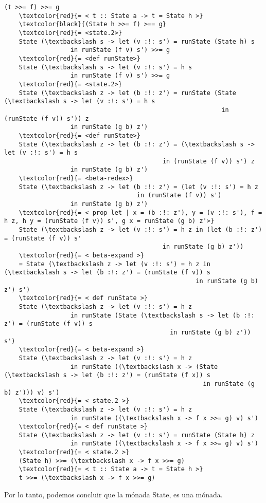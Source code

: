 \documentclass[11pt]{article}
\begin{document}
\begin{Verbatim}[commandchars=\\\{\}] 
    (t >>= f) >>= g
    \textcolor{red}{= < t :: State a -> t = State h >}
    \textcolor{black}{(State h >>= f) >== g}
    \textcolor{red}{= <state.2>}
    State (\textbackslash s -> let (v :!: s') = runState (State h) s
                  in runState (f v) s') >>= g
    \textcolor{red}{= <def runState>}
    State (\textbackslash s -> let (v :!: s') = h s 
                  in runState (f v) s') >>= g
    \textcolor{red}{= <state.2>}
    State (\textbackslash z -> let (b :!: z') = runState (State (\textbackslash s -> let (v :!: s') = h s
                                                           in (runState (f v)) s')) z
                  in runState (g b) z')
    \textcolor{red}{= <def runState>}
    State (\textbackslash z -> let (b :!: z') = (\textbackslash s -> let (v :!: s') = h s 
                                           in (runState (f v)) s') z
                  in runState (g b) z')
    \textcolor{red}{= <beta-redex>}
    State (\textbackslash z -> let (b :!: z') = (let (v :!: s') = h z 
                                    in (runState (f v)) s')
                  in runState (g b) z')
    \textcolor{red}{= < prop let | x = (b :!: z'), y = (v :!: s'), f = h z, h y = (runState (f v)) s', g x = runState (g b) z'>}
    State (\textbackslash z -> let (v :!: s') = h z in (let (b :!: z') = (runState (f v)) s' 
                                           in runState (g b) z'))
    \textcolor{red}{= < beta-expand >}
    = State (\textbackslash z -> let (v :!: s') = h z in (\textbackslash s -> let (b :!: z') = (runState (f v)) s
                                                    in runState (g b) z') s')
    \textcolor{red}{= < def runState >}
    State (\textbackslash z -> let (v :!: s') = h z 
                  in runState (State (\textbackslash s -> let (b :!: z') = (runState (f v)) s
                                             in runState (g b) z')) s')
    \textcolor{red}{= < beta-expand >}
    State (\textbackslash z -> let (v :!: s') = h z 
                  in runState ((\textbackslash x -> (State (\textbackslash s -> let (b :!: z') = (runState (f x)) s
                                                      in runState (g b) z'))) v) s')
    \textcolor{red}{= < state.2 >}
    State (\textbackslash z -> let (v :!: s') = h z 
                  in runState ((\textbackslash x -> f x >>= g) v) s')
    \textcolor{red}{= < def runState >}
    State (\textbackslash z -> let (v :!: s') = runState (State h) z 
                  in runState ((\textbackslash x -> f x >>= g) v) s')
    \textcolor{red}{= < state.2 >}
    (State h) >>= (\textbackslash x -> f x >>= g)
    \textcolor{red}{= < t :: State a -> t = State h >}
    t >>= (\textbackslash x -> f x >>= g)
\end{Verbatim}

Por lo tanto, podemos concluir que la mónada State, es una mónada.
\end{document}

